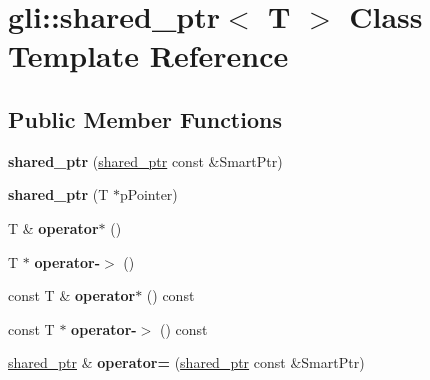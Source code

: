 \hypertarget{classgli_1_1shared__ptr}{\section{gli\-:\-:shared\-\_\-ptr$<$ \-T $>$ \-Class \-Template \-Reference}
\label{classgli_1_1shared__ptr}
}
\subsection*{\-Public \-Member \-Functions}
\begin{DoxyCompactItemize}
\item 
\hypertarget{classgli_1_1shared__ptr_a4a1ee3639c823c5bcdd99532954be8c6}{{\bfseries shared\-\_\-ptr} (\hyperlink{classgli_1_1shared__ptr}{shared\-\_\-ptr} const \&\-Smart\-Ptr)}\label{classgli_1_1shared__ptr_a4a1ee3639c823c5bcdd99532954be8c6}

\item 
\hypertarget{classgli_1_1shared__ptr_ad30fce7cdc1a045dc51881913691cf0e}{{\bfseries shared\-\_\-ptr} (\-T $\ast$p\-Pointer)}\label{classgli_1_1shared__ptr_ad30fce7cdc1a045dc51881913691cf0e}

\item 
\hypertarget{classgli_1_1shared__ptr_afe0723ed05cc3f8bd6ae44750c86af89}{\-T \& {\bfseries operator$\ast$} ()}\label{classgli_1_1shared__ptr_afe0723ed05cc3f8bd6ae44750c86af89}

\item 
\hypertarget{classgli_1_1shared__ptr_a407f697d5549226786bad55ee2b31ae4}{\-T $\ast$ {\bfseries operator-\/$>$} ()}\label{classgli_1_1shared__ptr_a407f697d5549226786bad55ee2b31ae4}

\item 
\hypertarget{classgli_1_1shared__ptr_a31f3a34f3d6aac4d941bb954fb139132}{const \-T \& {\bfseries operator$\ast$} () const }\label{classgli_1_1shared__ptr_a31f3a34f3d6aac4d941bb954fb139132}

\item 
\hypertarget{classgli_1_1shared__ptr_ac28bb6536a426157b060237200d1394c}{const \-T $\ast$ {\bfseries operator-\/$>$} () const }\label{classgli_1_1shared__ptr_ac28bb6536a426157b060237200d1394c}

\item 
\hypertarget{classgli_1_1shared__ptr_ae07dfaf8ed2262c0f14a16c647f5e238}{\hyperlink{classgli_1_1shared__ptr}{shared\-\_\-ptr} \& {\bfseries operator=} (\hyperlink{classgli_1_1shared__ptr}{shared\-\_\-ptr} const \&\-Smart\-Ptr)}\label{classgli_1_1shared__ptr_ae07dfaf8ed2262c0f14a16c647f5e238}


\end{DoxyCompactItemize}
